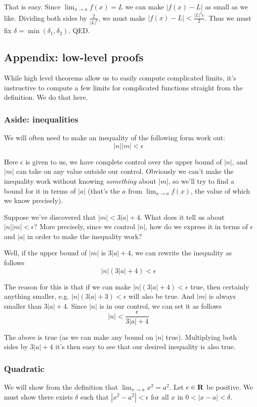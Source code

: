 That is easy. Since $\lim_{x\to a}f(x)=L$ we can make $|f(x)-L|$ as small as we like. Dividing both sides by $\frac{2}{|L|^2}$, we must make $|f(x)-L|<\frac{|L|^2\epsilon}{2}$. Thus we must fix $\delta=\min(\delta_1, \delta_2)$. QED.

\subsection{Appendix: low-level proofs}
While high level theorems allow us to easily compute complicated limits, it's instructive to compute a few limits for complicated functions straight from the definition. We do that here. 

\subsubsection{Aside: inequalities}

We will often need to make an inequality of the following form work out:
\[|n||m|<\epsilon\]

Here $\epsilon$ is given to us, we have complete control over the upper bound of $|n|$, and $|m|$ can take on any value outside our control. Obviously we can't make the inequality work without knowing \textit{something} about $|m|$, so we'll try to find a bound for it in terms of $|a|$ (that's the $a$ from $\lim_{x\to a}f(x)$, the value of which we know precisely).

\vs

Suppose we've discovered that $|m|<3|a|+4$. What does it tell us about $|n||m|<\epsilon$? More precisely, since we control $|n|$, how do we express it in terms of $\epsilon$ and $|a|$ in order to make the inequality work?

\vs

Well, if the upper bound of $|m|$ is $3|a|+4$, we can rewrite the inequality as follows
\[|n|(3|a|+4)<\epsilon\]

The reason for this is that if we can make $|n|(3|a|+4)<\epsilon$ true, then certainly anything smaller, e.g. $|n|(3|a|+3)<\epsilon$ will also be true. And $|m|$ is always smaller than $3|a|+4$. Since $|n|$ is in our control, we can set it as follows
\[|n|<\frac{\epsilon}{3|a|+4}\]

The above is true (as we can make any bound on $|n|$ true). Multiplying both sides by $3|a|+4$ it's then easy to see that our desired inequality is also true.

\subsubsection{Quadratic}
We will show from the definition that $\lim_{x\to a}x^2=a^2$. Let $\epsilon\in\mathbf{R}$ be positive. We must show there exists $\delta$ such that $|x^2-a^2|<\epsilon$ for all $x$ in $0<|x-a|<\delta$.

